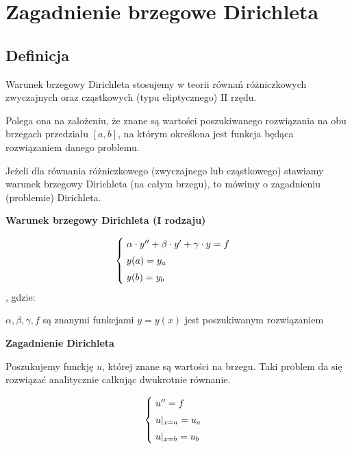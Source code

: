 \section{Zagadnienie brzegowe Dirichleta}
\subsection{Definicja}

Warunek brzegowy Dirichleta stosujemy w teorii równań różniczkowych zwyczajnych oraz cząstkowych (typu eliptycznego) II rzędu.

Polega ona na zalożeniu, że znane są wartości poszukiwanego rozwiązania na obu brzegach przedziału $[a,b]$, na którym określona jest funkcja będąca rozwiązaniem danego problemu.

Jeżeli dla równania różniczkowego (zwyczajnego lub cząstkowego) stawiamy warunek brzegowy Dirichleta (na całym brzegu), to mówimy o zagadnieniu (problemie) Dirichleta. 

\textbf{Warunek brzegowy Dirichleta (I rodzaju)}

\[
\begin{cases}
\vspace{0.1cm} 
\hspace{0,1cm}\alpha \cdot y'' + \beta \cdot y'+\gamma \cdot y=f \\
\vspace{0.1cm}
\hspace{0,1cm}y(a)=y_{a} \\
\hspace{0,1cm}y(b)=y_{b}
\end{cases}
\]
, gdzie:

$\alpha, \beta, \gamma, f$ są znanymi funkcjami
\newline
$y = y(x)$ jest poszukiwanym rozwiązaniem
\newline

\textbf{Zagadnienie Dirichleta}

Poszukujemy funckję $u$, której znane są wartości na brzegu. Taki problem da się rozwiązać analitycznie całkując dwukrotnie równanie.

\[
\begin{cases}
\vspace{0.1cm} 
\hspace{0,1cm}u''=f \\
\vspace{0.1cm}
\hspace{0,1cm}u|_{x=a}=u_{a} \\
\hspace{0,1cm}u|_{x=b}=u_{b}
\end{cases}
\]
\newline


